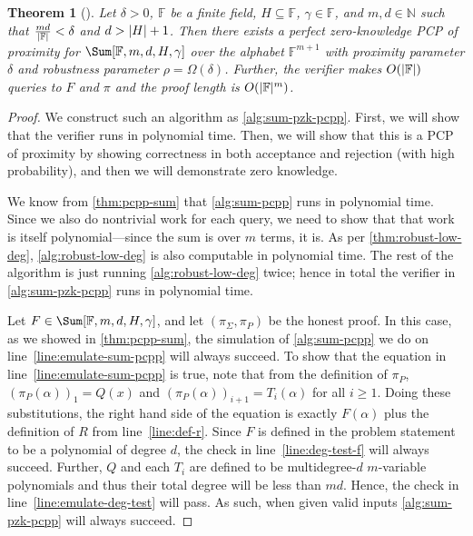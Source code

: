 \documentclass[english,12pt]{reedthesis}
\theoremstyle{plain}
\newtheorem{thm}{Theorem}[section]
\theoremstyle{definition}
\theoremstyle{remark}
\DeclarePairedDelimiter{\abs}{\lvert}{\rvert}
\begin{document}
\begin{thm}[{\cite[Lemma 5.1]{GOS25}}]\label{thm:pcpp-sum-pzk}
  Let $\delta > 0$, $\mathbb{F}$ be a finite field, $H \subseteq \mathbb{F}$,
  $\gamma \in \mathbb{F}$, and $m, d \in \mathbb{N}$ such that $\frac{md}{\abs{\mathbb{F}}} < \delta$
  and $d > \abs{H} + 1$. Then there exists a perfect zero-knowledge PCP of
  proximity for $\Sum[\mathbb{F}, m, d, H, \gamma]$ over the alphabet
  $\mathbb{F}^{m+1}$ with proximity parameter $\delta$ and robustness parameter
  $\rho = \Omega(\delta)$. Further, the verifier makes $O(\abs{\mathbb{F}})$ queries to $F$
  and $\pi$ and the proof length is $O(\abs{\mathbb{F}}^{m})$.
\end{thm}

\begin{proof}
  We construct such an algorithm as \cref{alg:sum-pzk-pcpp}. First, we will show
  that the verifier runs in polynomial time. Then, we will show that this is a
  PCP of proximity by showing correctness in both acceptance and rejection (with
  high probability), and then we will demonstrate zero
  knowledge. %

  We know from \cref{thm:pcpp-sum} that \cref{alg:sum-pcpp} runs in polynomial
  time. Since we also do nontrivial work for each query, we need to show that
  that work is itself polynomial---since the sum is over $m$ terms, it is. As per
  \cref{thm:robust-low-deg}, \cref{alg:robust-low-deg} is also computable in
  polynomial time. The rest of the algorithm is just running
  \cref{alg:robust-low-deg} twice; hence in total the verifier in
  \cref{alg:sum-pzk-pcpp} runs in polynomial time.

  Let $F \in \Sum[\mathbb{F}, m, d, H, \gamma]$, and let $(\pi_{\Sigma}, \pi_{P})$ be the honest
  proof. In this case, as we showed in \cref{thm:pcpp-sum}, the simulation of
  \cref{alg:sum-pcpp} we do on line~\ref{line:emulate-sum-pcpp} will always
  succeed. To show that the equation in line~\ref{line:emulate-sum-pcpp} is
  true, note that from the definition of $\pi_{P}$, $(\pi_{P}(\alpha))_{1} = Q(x)$ and
  $(\pi_{P}(\alpha))_{i+1} = T_{i}(\alpha)$ for all $i \ge 1$. Doing these substitutions, the
  right hand side of the equation is exactly $F(\alpha)$ plus the definition of $R$
  from line~\ref{line:def-r}. Since $F$ is defined in the problem statement to
  be a polynomial of degree $d$, the check in line~\ref{line:deg-test-f} will
  always succeed. Further, $Q$ and each $T_{i}$ are defined to be
  multidegree-$d$ $m$-variable polynomials and thus their total degree will be
  less than $md$. Hence, the check in line~\ref{line:emulate-deg-test} will
  pass. As such, when given valid inputs \cref{alg:sum-pzk-pcpp} will always
  succeed.


\end{proof}
\end{document}
